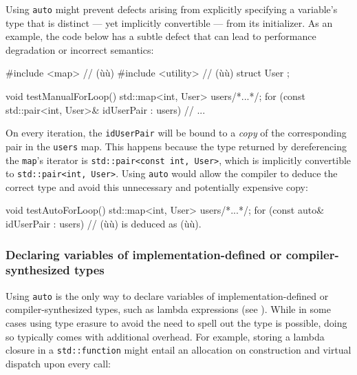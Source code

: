 Using \lstinline!auto! might prevent defects arising from explicitly
specifying a variable's type that is distinct --- yet implicitly
convertible --- from its initializer. As an example, the code below has
a subtle defect that can lead to performance degradation or incorrect
semantics:

\begin{emcppshiddenlisting}[emcppsbatch={e6,e7}]
#include <map>      // (ù{}ù)
#include <utility>  // (ù{}ù)
struct User {};
\end{emcppshiddenlisting}
\begin{emcppslisting}[emcppsbatch=e6]
void testManualForLoop()
{
    std::map<int, User> users{/*...*/};
    for (const std::pair<int, User>& idUserPair : users)
    {
        // ...
    }
}
\end{emcppslisting}

\noindent On every iteration, the \lstinline!idUserPair! will be bound to a
\emph{copy} of the corresponding pair in the \lstinline!users! map. This
happens because the type returned by dereferencing the \lstinline!map!'s
iterator is \lstinline!std::pair<const!~\lstinline!int,!~\lstinline!User>!, which
is implicitly convertible to \lstinline!std::pair<int,!~\lstinline!User>!.
Using \lstinline!auto! would allow the compiler to deduce the correct type
and avoid this unnecessary and potentially expensive copy:

\begin{emcppslisting}[emcppsbatch=e7]
void testAutoForLoop()
{
    std::map<int, User> users{/*...*/};
    for (const auto& idUserPair : users)
    {
        // (ù{}ù) is deduced as (ù{}ù).
    }
}
\end{emcppslisting}


\subsubsection[Declaring variables of implementation-defined or compiler-synthesized types]{Declaring variables of implementation-defined or compiler-synthesized types}\label{declaring-variables-of-implementation-defined-or-compiler-synthesized-types}

Using \lstinline!auto! is the only way to declare variables of
implementation-defined or compiler-synthesized types, such as
lambda expressions (see ). While in some cases
using type erasure to avoid the need to spell out the type is possible, doing so typically
comes with additional overhead. For example, storing a lambda closure in
a \lstinline!std::function! might entail an allocation on construction and
virtual dispatch upon every call:

